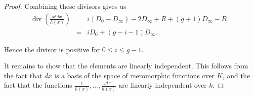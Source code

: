 \documentclass[11pt]{article} %
\theoremstyle{remark}\newtheorem*{rem}{Remark}
\DeclareMathOperator{\di}{div}
\begin{document}
\begin{proof}
Combining these divisors gives us
\begin{eqnarray*}
 \di \left(\frac{x^idx}{h(x)}\right) & = & i(D_0-D_\infty)-2D_\infty + R + (g+1)D_\infty -R \\
 & = & iD_0 + (g-i-1)D_\infty.
\end{eqnarray*}

Hence the divisor is positive for $0\leq i \leq g-1$.




It remains to show that the elements are linearly independent.
This follows from the fact that $dx$ is a basis of the space of meromorphic functions over $K$, and the fact that the functions $\frac{1}{h(x)},\ldots , \frac{x^{g-1}}{h(x)}$ are linearly independent over $k$.
\end{proof}





\end{document}
